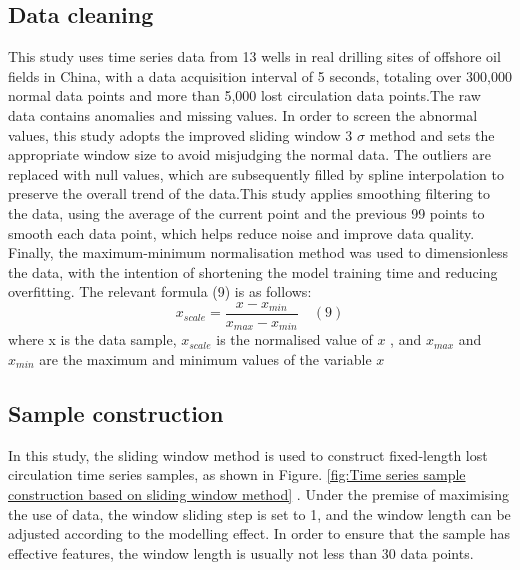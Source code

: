 \documentclass[journal,article,submit,pdftex,moreauthors]{Definitions/mdpi}
\begin{document}
\subsection{Data cleaning}
\label{subsec:Data cleaning}
This study uses time series data from 13 wells in real drilling sites of offshore oil fields in China, with a data acquisition interval of 5 seconds, totaling over 300,000 normal data points and more than 5,000 lost circulation data points.The raw data contains anomalies and missing values. In order to screen the abnormal values, this study adopts the improved sliding window 3 \(\sigma\) method and sets the appropriate window size to avoid misjudging the normal data. The outliers are replaced with null values, which are subsequently filled by spline interpolation to preserve the overall trend of the data.This study applies smoothing filtering to the data, using the average of the current point and the previous 99 points to smooth each data point, which helps reduce noise and improve data quality. Finally, the maximum-minimum normalisation method was used to dimensionless the data, with the intention of shortening the model training time and reducing overfitting. The relevant formula (9) is as follows:
$$ x _ { s c a l e } = \frac { x - x _ { m i n } } { x _ { m a x } - x _ { m i n } }\quad (9)$$
where x is the data sample, \({{x}_{scale}}\) is the normalised value of \({{x}}\) , and \({{x}_{max}}\)  and \({{x}_{min}}\)  are the maximum and minimum values of the variable \({{x}}\)
\subsection{Sample construction}

In this study, the sliding window method is used to construct fixed-length  lost circulation time series samples, as shown in Figure. \ref{fig:Time series sample construction based on sliding window method} . Under the premise of maximising the use of data, the window sliding step is set to 1, and the window length can be adjusted according to the modelling effect. In order to ensure that the sample has effective features, the window length is usually not less than 30 data points.
\end{document}
